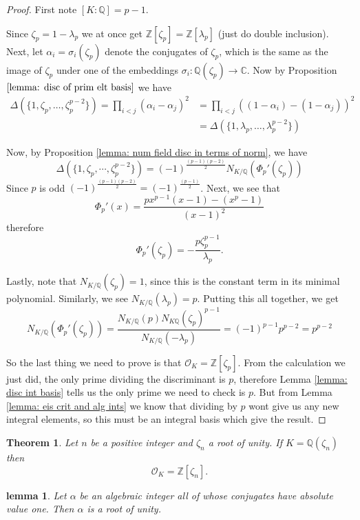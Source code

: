 \documentclass[11pt,a4paper]{amsart}
\theoremstyle{plain}
\newtheorem{theorem}[subsection]{Theorem}
\newtheorem{lemma}[subsection]{lemma}
\theoremstyle{definition}
\theoremstyle{definition}
\newcommand{\ZZ}{\mathbb{Z}}
\def\CC{\mathbb{C}}
\def\QQ{\mathbb{Q}}
\def \a{\alpha}
\def \lam {\lambda}
\def \OO {\mathcal{O}}
\begin{document}
	\begin{proof}
		First note $[K:\QQ]=p-1$.
		
		Since $\zeta_p=1-\lam_p$ we at once get $\ZZ[\zeta_p]=\ZZ[\lam_p]$ (just do double inclusion). Next, let $\a_i=\sigma_i(\zeta_p)$ denote the conjugates of $\zeta_p$, which is the same as the image of $\zeta_p$ under one of the embeddings $\sigma_i: \QQ(\zeta_p) \to \CC$. Now  by Proposition $\ref{lemma: disc of prim elt basis}$ we have \begin{align*}\Delta(\{1,\zeta_p,\dots,\zeta_p^{p-2}\})=\prod_{i < j}  (\a_i-\a_j)^2 &=\prod_{i < j}  ((1-\a_i)-(1-\a_j))^2\\&=\Delta(\{1,\lam_p,\dots,\lam_p^{p-2}\})\end{align*}
		
		Now, by Proposition \ref{lemma: num field disc in terms of norm}, we have \[\Delta(\{1,\zeta_p,\cdots,\zeta_p^{p-2}\})=(-1)^{\frac{(p-1)(p-2)}{2}}N_{K/\QQ}(\Phi_p'(\zeta_p)  )\]
		Since $p$ is odd $(-1)^{\frac{(p-1)(p-2)}{2}}=(-1)^{\frac{(p-1)}{2}}$. Next, we see that \[\Phi_p'(x)=\frac{px^{p-1}(x-1)-(x^p-1)}{(x-1)^2}\] therefore \[\Phi_p'(\zeta_p)=-\frac{p\zeta_p^{p-1}}{\lam_p}.\]
		
		Lastly, note that $N_{K/\QQ}(\zeta_p)=1$, since this is the constant term in its minimal polynomial. Similarly, we see $N_{K/\QQ}(\lam_p)=p$. Putting this all together, we get \[N_{K/\QQ}(\Phi_p'(\zeta_p)  )=\frac{N_{K/\QQ}(p)N_{K\QQ}(\zeta_p)^{p-1}}{N_{K/\QQ}(-\lam_p)}=(-1)^{p-1}p^{p-2}=p^{p-2}\]
		
		So the last thing we need to prove is that $\OO_K=\ZZ[\zeta_p]$. From the calculation we just did, the only prime dividing the discriminant is $p$, therefore Lemma \ref{lemma: disc int basis} tells us the only prime we need to check is $p$. But from Lemma \ref{lemma: eis crit and alg ints} we know that dividing by $p$ wont give us any new integral elements, so this must be an integral basis which give the result.
		
		
		
	\end{proof}
	
	
	\begin{theorem}\label{theorem: ring of ints of cyclo field}
		Let $n$ be a positive integer and $\zeta_n$ a root of unity. If $K=\QQ(\zeta_n)$ then \[\OO_K=\ZZ[\zeta_n].\]
	\end{theorem}

	
	\begin{lemma}\label{lemma: alg_int_abs_val_one}
		Let $\a$ be an algebraic integer all of whose conjugates have absolute value one. Then $\a$ is a root of unity.
	\end{lemma}
	
\end{document}
